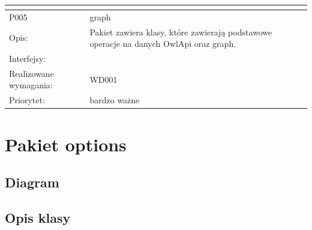 \documentclass[a4paper,10pt]{article}
\begin{document}
\begin{center}
\begin{longtable}{|m{3cm}|m{9cm}|}
\multicolumn{2}{c}{} \\
 \hline

P005 & graph\\ \hline
Opis: & Pakiet zawiera klasy, które zawierają podstawowe operacje na danych OwlApi oraz graph. \\ \hline
Interfejsy: &     \\ \hline
Realizowane wymagania: & WD001 \\ \hline
Priorytet: & bardzo ważne \\ \hline


\end{longtable}

\end{center}

\section{Pakiet options}

\subsection{Diagram}


\subsection{Opis klasy}
\end{document}
